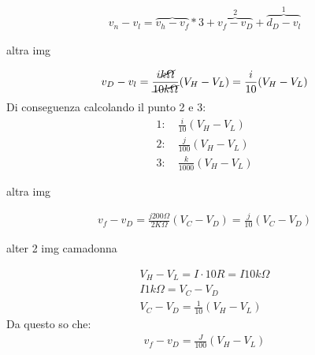 \documentclass[a4paper, oneside]{article}
\begin{document}
\begin{gather*}
    v_n - v_l = \overbrace{v_h - v_f}*3 + \overbrace{v_f - v_D}^2 + \overbrace{d_D - v_l}^1
\end{gather*}
\begin{center}
    altra img
\end{center}
\begin{gather*}
    v_D - v_l = \frac{i \cancel{k\Omega}}{\cancel{10 k \Omega}} (V_H - V_L) = \frac{i}{10} (V_H - V_L)
\end{gather*}
Di conseguenza calcolando il punto 2 e 3:
\begin{gather*}
    1: \quad \frac{i}{10} (V_H - V_L)\\
    2: \quad \frac{j}{100} (V_H - V_L)\\
    3: \quad \frac{k}{1000} (V_H - V_L)
\end{gather*}
\begin{center}
    altra img
\end{center}
\begin{gather*}
    v_f - v_D = \frac{j 200 \Omega}{ 2 K \Omega} (V_C - V_D) = \frac{j}{10} (V_C - V_D)
\end{gather*}
\begin{center}
    alter 2 img camadonna
\end{center}
\begin{gather*}
    V_H - V_L = I \cdot 10 R = I 10 k \Omega\\
    I 1 k \Omega = V_C - V_D\\
    V_C - V_D = \frac{1}{10} (V_H - V_L)
\end{gather*}
Da questo so che:
\begin{gather*}
    v_f - v_D = \frac{J}{100} (V_H - V_L)
\end{gather*}
\end{document}
